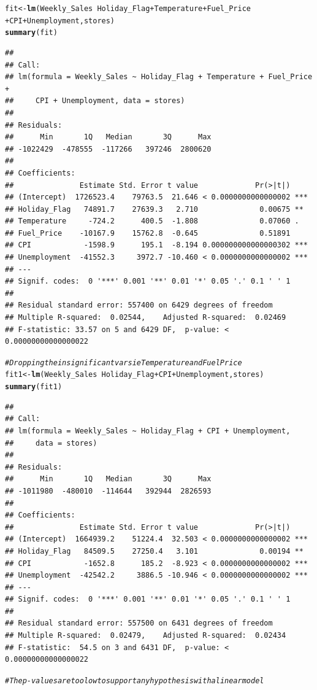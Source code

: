 \documentclass{article}\usepackage[]{graphicx}\usepackage[]{color}
\makeatletter
\newcommand{\hlcom}[1]{\textcolor[rgb]{0.678,0.584,0.686}{\textit{#1}}}%
\newcommand{\hlopt}[1]{\textcolor[rgb]{0,0,0}{#1}}%
\newcommand{\hlstd}[1]{\textcolor[rgb]{0.345,0.345,0.345}{#1}}%
\newcommand{\hlkwb}[1]{\textcolor[rgb]{0.69,0.353,0.396}{#1}}%
\newcommand{\hlkwd}[1]{\textcolor[rgb]{0.737,0.353,0.396}{\textbf{#1}}}%
\newenvironment{kframe}{%
 \def\at@end@of@kframe{}%
 \ifinner\ifhmode%
  \def\at@end@of@kframe{\end{minipage}}%
  \begin{minipage}{\columnwidth}%
 \fi\fi%
 \def\FrameCommand##1{\hskip\@totalleftmargin \hskip-\fboxsep
 \colorbox{shadecolor}{##1}\hskip-\fboxsep
     \hskip-\linewidth \hskip-\@totalleftmargin \hskip\columnwidth}%
 \MakeFramed {\advance\hsize-\width
   \@totalleftmargin\z@ \linewidth\hsize
   \@setminipage}}%
 {\par\unskip\endMakeFramed%
 \at@end@of@kframe}
\newenvironment{knitrout}{}{} %
\makeatother
\begin{document}
\begin{knitrout}
\begin{kframe}
\begin{alltt}
\hlstd{fit} \hlkwb{<-} \hlkwd{lm}\hlstd{(Weekly_Sales} \hlopt{~} \hlstd{Holiday_Flag} \hlopt{+} \hlstd{Temperature} \hlopt{+} \hlstd{Fuel_Price}
          \hlopt{+} \hlstd{CPI} \hlopt{+} \hlstd{Unemployment, stores)}
\hlkwd{summary}\hlstd{(fit)}
\end{alltt}
\begin{verbatim}
## 
## Call:
## lm(formula = Weekly_Sales ~ Holiday_Flag + Temperature + Fuel_Price + 
##     CPI + Unemployment, data = stores)
## 
## Residuals:
##      Min       1Q   Median       3Q      Max 
## -1022429  -478555  -117266   397246  2800620 
## 
## Coefficients:
##               Estimate Std. Error t value             Pr(>|t|)    
## (Intercept)  1726523.4    79763.5  21.646 < 0.0000000000000002 ***
## Holiday_Flag   74891.7    27639.3   2.710              0.00675 ** 
## Temperature     -724.2      400.5  -1.808              0.07060 .  
## Fuel_Price    -10167.9    15762.8  -0.645              0.51891    
## CPI            -1598.9      195.1  -8.194 0.000000000000000302 ***
## Unemployment  -41552.3     3972.7 -10.460 < 0.0000000000000002 ***
## ---
## Signif. codes:  0 '***' 0.001 '**' 0.01 '*' 0.05 '.' 0.1 ' ' 1
## 
## Residual standard error: 557400 on 6429 degrees of freedom
## Multiple R-squared:  0.02544,	Adjusted R-squared:  0.02469 
## F-statistic: 33.57 on 5 and 6429 DF,  p-value: < 0.00000000000000022
\end{verbatim}
\begin{alltt}
\hlcom{#Dropping the insignificant vars ie Temperature and Fuel Price}
\hlstd{fit1} \hlkwb{<-} \hlkwd{lm}\hlstd{(Weekly_Sales} \hlopt{~} \hlstd{Holiday_Flag} \hlopt{+} \hlstd{CPI} \hlopt{+} \hlstd{Unemployment, stores)}
\hlkwd{summary}\hlstd{(fit1)}
\end{alltt}
\begin{verbatim}
## 
## Call:
## lm(formula = Weekly_Sales ~ Holiday_Flag + CPI + Unemployment, 
##     data = stores)
## 
## Residuals:
##      Min       1Q   Median       3Q      Max 
## -1011980  -480010  -114644   392944  2826593 
## 
## Coefficients:
##               Estimate Std. Error t value             Pr(>|t|)    
## (Intercept)  1664939.2    51224.4  32.503 < 0.0000000000000002 ***
## Holiday_Flag   84509.5    27250.4   3.101              0.00194 ** 
## CPI            -1652.8      185.2  -8.923 < 0.0000000000000002 ***
## Unemployment  -42542.2     3886.5 -10.946 < 0.0000000000000002 ***
## ---
## Signif. codes:  0 '***' 0.001 '**' 0.01 '*' 0.05 '.' 0.1 ' ' 1
## 
## Residual standard error: 557500 on 6431 degrees of freedom
## Multiple R-squared:  0.02479,	Adjusted R-squared:  0.02434 
## F-statistic:  54.5 on 3 and 6431 DF,  p-value: < 0.00000000000000022
\end{verbatim}
\begin{alltt}
\hlcom{#The p-values are too low to support any hypothesis with a linear model}


\end{alltt}
\end{kframe}
\end{knitrout}
\end{document}
